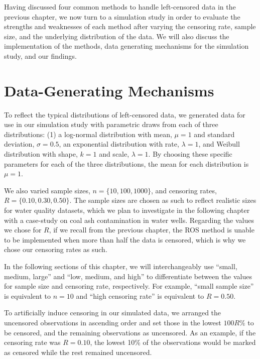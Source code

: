 \documentclass[12pt, twoside]{amherstthesis}
\begin{document}
Having discussed four common methods to handle left-censored data in the previous chapter, we now turn to a simulation study in order to evaluate the strengths and weaknesses of each method after varying the censoring rate, sample size, and the underlying distribution of the data. We will also discuss the implementation of the methods, data generating mechanisms for the simulation study, and our findings.

\hypertarget{data_generating_mechanisms}{%
\section{Data-Generating Mechanisms}\label{data_generating_mechanisms}}

To reflect the typical distributions of left-censored data, we generated data for use in our simulation study with parametric draws from each of three distributions: (1) a log-normal distribution with mean, \(\mu = 1\) and standard deviation, \(\sigma = 0.5\), an exponential distribution with rate, \(\lambda = 1\), and Weibull distribution with shape, \(k = 1\) and scale, \(\lambda = 1\). By choosing these specific parameters for each of the three distributions, the mean for each distribution is \(\mu = 1\).

We also varied sample sizes, \(n = \{10, 100, 1000\}\), and censoring rates, \(R = \{0.10, 0.30, 0.50\}\). The sample sizes are chosen as such to reflect realistic sizes for water quality datasets, which we plan to investigate in the following chapter with a case-study on coal ash contamination in water wells. Regarding the values we chose for \(R\), if we recall from the previous chapter, the ROS method is unable to be implemented when more than half the data is censored, which is why we chose our censoring rates as such.

In the following sections of this chapter, we will interchangeably use ``small, medium, large'' and ``low, medium, and high'' to differentiate between the values for sample size and censoring rate, respectively. For example, ``small sample size'' is equivalent to \(n = 10\) and ``high censoring rate'' is equivalent to \(R = {0.50}\).

To artificially induce censoring in our simulated data, we arranged the uncensored observations in ascending order and set those in the lowest \(100R \%\) to be censored, and the remaining observations as uncensored. As an example, if the censoring rate was \(R = 0.10\), the lowest 10\% of the observations would be marked as censored while the rest remained uncensored.
\end{document}
